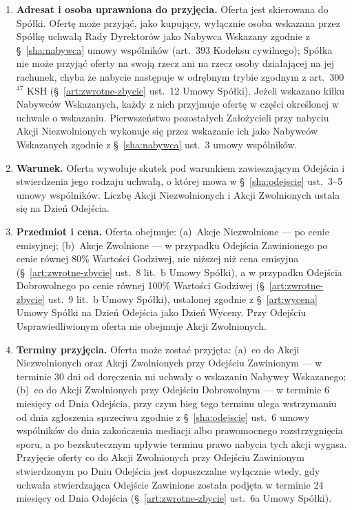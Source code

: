 \documentclass[12pt,a4paper]{report}
\begin{document}
\begin{enumerate}
  \item \textbf{Adresat i osoba uprawniona do przyjęcia.} Oferta jest skierowana do Spółki. Ofertę może przyjąć, jako kupujący, wyłącznie osoba wskazana przez Spółkę uchwałą Rady Dyrektorów jako Nabywca Wskazany zgodnie z §~\ref{sha:nabywca} umowy wspólników (art.~393 Kodeksu cywilnego); Spółka nie może przyjąć oferty na swoją rzecz ani na rzecz osoby działającej na jej rachunek, chyba że nabycie następuje w odrębnym trybie zgodnym z art.~300$^{47}$ KSH (§~\ref{art:zwrotne-zbycie} ust.~12 Umowy Spółki). Jeżeli wskazano kilku Nabywców Wskazanych, każdy z nich przyjmuje ofertę w części określonej w uchwale o wskazaniu. Pierwszeństwo pozostałych Założycieli przy nabyciu Akcji Niezwolnionych wykonuje się przez wskazanie ich jako Nabywców Wskazanych zgodnie z §~\ref{sha:nabywca} ust.~3 umowy wspólników.
  \item \textbf{Warunek.} Oferta wywołuje skutek pod warunkiem zawieszającym Odejścia i stwierdzenia jego rodzaju uchwałą, o której mowa w §~\ref{sha:odejscie} ust.~3--5 umowy wspólników. Liczbę Akcji Niezwolnionych i Akcji Zwolnionych ustala się na Dzień Odejścia.
  \item \textbf{Przedmiot i cena.} Oferta obejmuje: (a)~Akcje Niezwolnione --- po cenie emisyjnej; (b)~Akcje Zwolnione --- w przypadku Odejścia Zawinionego po cenie równej 80\% Wartości Godziwej, nie niższej niż cena emisyjna (§~\ref{art:zwrotne-zbycie} ust.~8 lit.~b Umowy Spółki), a w przypadku Odejścia Dobrowolnego po cenie równej 100\% Wartości Godziwej (§~\ref{art:zwrotne-zbycie} ust.~9 lit.~b Umowy Spółki), ustalonej zgodnie z §~\ref{art:wycena} Umowy Spółki na Dzień Odejścia jako Dzień Wyceny. Przy Odejściu Usprawiedliwionym oferta nie obejmuje Akcji Zwolnionych.
  \item \textbf{Terminy przyjęcia.} Oferta może zostać przyjęta: (a)~co do Akcji Niezwolnionych oraz Akcji Zwolnionych przy Odejściu Zawinionym --- w terminie 30 dni od doręczenia mi uchwały o wskazaniu Nabywcy Wskazanego; (b)~co do Akcji Zwolnionych przy Odejściu Dobrowolnym --- w terminie 6 miesięcy od Dnia Odejścia, przy czym bieg tego terminu ulega wstrzymaniu od dnia zgłoszenia sprzeciwu zgodnie z §~\ref{sha:odejscie} ust.~6 umowy wspólników do dnia zakończenia mediacji albo prawomocnego rozstrzygnięcia sporu, a po bezskutecznym upływie terminu prawo nabycia tych akcji wygasa. Przyjęcie oferty co do Akcji Zwolnionych przy Odejściu Zawinionym stwierdzonym po Dniu Odejścia jest dopuszczalne wyłącznie wtedy, gdy uchwała stwierdzająca Odejście Zawinione została podjęta w terminie 24 miesięcy od Dnia Odejścia (§~\ref{art:zwrotne-zbycie} ust.~6a Umowy Spółki).

\end{enumerate}
\end{document}
